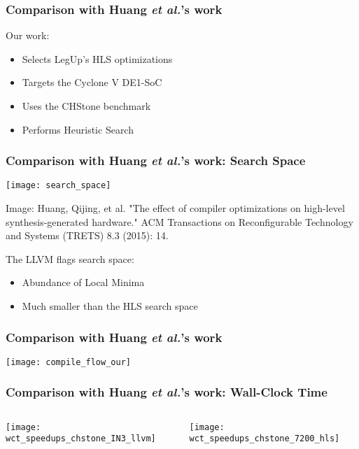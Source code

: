 \documentclass[10pt, compress, aspectratio=169]{beamer}
\begin{document}
\begin{frame}
    \frametitle{Comparison with Huang \textit{et al.}'s work}
    Our work:
    \begin{itemize}
        \item Selects \alert{LegUp's HLS} optimizations
        \item Targets the Cyclone V DE1-SoC
        \item Uses the \alert{CHStone benchmark}
        \item Performs \alert{Heuristic Search}
    \end{itemize}
\end{frame}

\begin{frame}
    \frametitle{Comparison with Huang \textit{et al.}'s work: Search Space}
    \begin{center}
        \texttt{[image: search\_space]}

        \tiny{Image: Huang, Qijing, et al. "The effect of compiler
        optimizations on high-level synthesis-generated hardware." ACM
        Transactions on Reconfigurable Technology and Systems (TRETS) 8.3
        (2015): 14.}
    \end{center}

    The LLVM flags search space:
    \begin{itemize}
        \item Abundance of \alert{Local Minima}
        \item \alert{Much smaller} than the HLS search space
    \end{itemize}
\end{frame}

\begin{frame}
    \frametitle{Comparison with Huang \textit{et al.}'s work}
    \begin{center}
        \texttt{[image: compile\_flow\_our]}
    \end{center}
\end{frame}

\begin{frame}
    \frametitle{Comparison with Huang \textit{et al.}'s work: Wall-Clock Time}
    \begin{columns}[T]
        \begin{center}
            \texttt{[image: wct\_speedups\_chstone\_IN3\_llvm]}
        \end{center}
        \begin{center}
            \texttt{[image: wct\_speedups\_chstone\_7200\_hls]}
        \end{center}
    \end{columns}
\end{frame}
\end{document}
